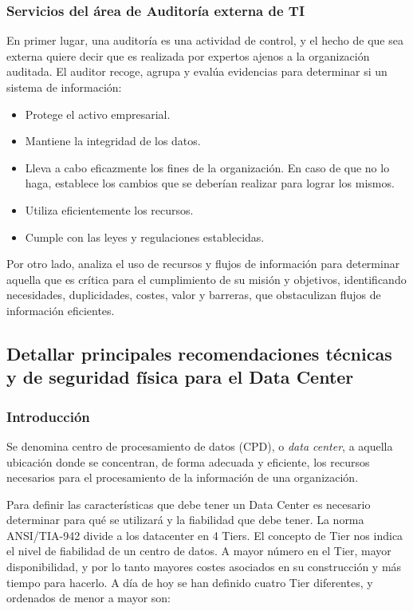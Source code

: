     \subsubsection{Servicios del área de Auditoría externa de TI}
    
    En primer lugar, una auditoría es una actividad de control, y el hecho de que sea externa quiere decir que es realizada por expertos ajenos a la organización auditada.
    El auditor recoge, agrupa y evalúa evidencias para determinar si un sistema de información:
    
    \begin{itemize}
		\item Protege el activo empresarial.
        \item Mantiene la integridad de los datos.
        \item Lleva a cabo eficazmente los fines de la organización. En caso de que no lo haga, establece los cambios que se deberían realizar para lograr los mismos.
        \item Utiliza eficientemente los recursos.
        \item Cumple con las leyes y regulaciones establecidas.
	\end{itemize}
    
    Por otro lado, analiza el uso de recursos y flujos de información para determinar aquella que es crítica para el cumplimiento de su misión y objetivos, identificando necesidades, duplicidades, costes, valor y barreras, que obstaculizan flujos de información eficientes.
    
    
    \newpage
    
    \subsection{Detallar principales recomendaciones técnicas y de seguridad física para el Data Center}
    
    \subsubsection{Introducción}
    Se denomina centro de procesamiento de datos (CPD), o \textit{data center}, a aquella ubicación donde se concentran, de forma adecuada y eficiente, los recursos necesarios para el procesamiento de la información de una organización.
    
    Para definir las características que debe tener un Data Center es necesario determinar para qué se utilizará y la fiabilidad que debe tener. La norma  ANSI/TIA-942 divide a los datacenter en 4 Tiers. El concepto de Tier nos indica el nivel de fiabilidad de un centro de datos. A mayor número en el Tier, mayor disponibilidad, y por lo tanto mayores costes asociados en su construcción y más tiempo para hacerlo. A día de hoy se han definido cuatro Tier diferentes, y ordenados de menor a mayor son:
    
